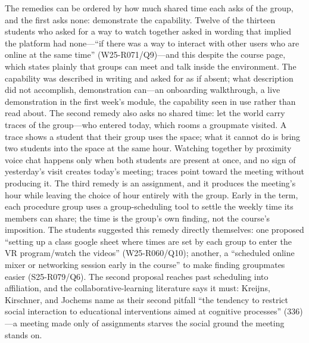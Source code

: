 The remedies can be ordered by how much shared time each asks of the
group, and the first asks none: demonstrate the capability. Twelve of
the thirteen students who asked for a way to watch together asked in
wording that implied the platform had none---``if there was a way to
interact with other users who are online at the same time''
(W25-R071/Q9)---and this despite the course page, which states plainly
that groups can meet and talk inside the environment. The capability
was described in writing and asked for as if absent; what description
did not accomplish, demonstration can---an onboarding walkthrough, a
live demonstration in the first week's module, the capability seen in
use rather than read about. The second remedy also asks no shared
time: let the world carry traces of the group---who entered today,
which rooms a groupmate visited. A trace shows a student that their
group uses the space; what it cannot do is bring two students into the
space at the same hour. Watching together by proximity voice chat happens
only when both students are present at once, and no sign of
yesterday's visit creates today's meeting; traces point toward the
meeting without producing it. The third remedy is an assignment, and
it produces the meeting's hour while leaving the choice of hour
entirely with the group. Early in the term, each procedure group uses
a group-scheduling tool to settle the weekly time its members can
share; the time is the group's own finding, not the course's
imposition. The students suggested this remedy directly themselves:
one proposed ``setting up a class google sheet where times are set by
each group to enter the VR program/watch the videos'' (W25-R060/Q10);
another, a ``scheduled online mixer or networking session early in the
course'' to make finding groupmates easier (S25-R079/Q6). The second
proposal reaches past scheduling into affiliation, and the
collaborative-learning literature says it must: Kreijns, Kirschner,
and Jochems name as their second pitfall ``the tendency to restrict
social interaction to educational interventions aimed at cognitive
processes'' (336)---a meeting made only of assignments starves the
social ground the meeting stands on.


